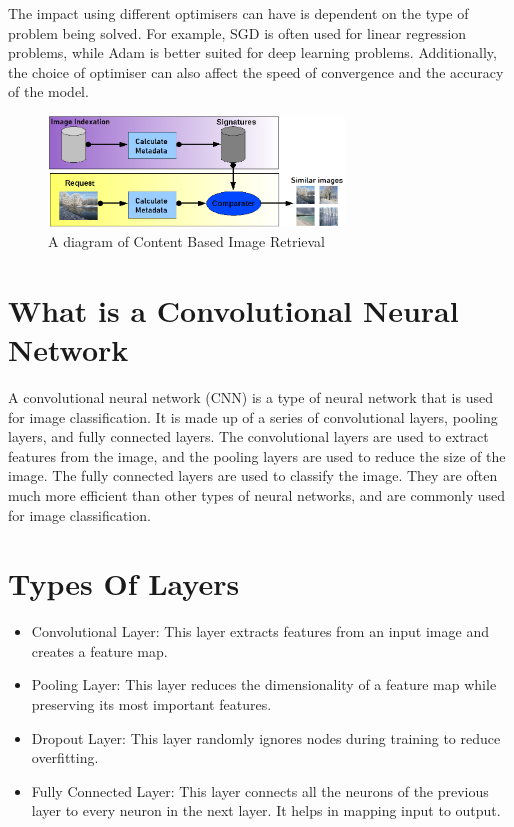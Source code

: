 \documentclass[]{final_report}
\begin{document}
The impact using different optimisers can have is dependent on the type of problem being solved. 
For example, SGD is often used for linear regression problems, while Adam is 
better suited for deep learning problems. 
Additionally, the choice of optimiser can also affect the speed of convergence and the accuracy of the model.

\begin{figure}[h]
  \centering
  \includegraphics[width=0.7\textwidth]{images/Principe_cbir.png}
  \caption{A diagram of Content Based Image Retrieval \cite{ContentBasedImageRetrieval}}
\end{figure}


\section{What is a Convolutional Neural Network}
A convolutional neural network (CNN) is a type of neural network that is used for image classification.
It is made up of a series of convolutional layers, pooling layers, and fully connected layers.
The convolutional layers are used to extract features from the image, and the pooling layers are used to reduce the size of the image.
The fully connected layers are used to classify the image.
They are often much more efficient than other types of neural networks, and are commonly used for image classification.


\section{Types Of Layers}

\begin{itemize}
  \item Convolutional Layer: This layer extracts features from an input image and creates a feature map.

  \item  Pooling Layer: This layer reduces the dimensionality of a feature map while preserving its most important features.
  
  \item  Dropout Layer: This layer randomly ignores nodes during training to reduce overfitting.
  
  \item  Fully Connected Layer: This layer connects all the neurons of the previous layer to every neuron in the next layer. It helps in mapping input to output.
\end{itemize}
\end{document}
